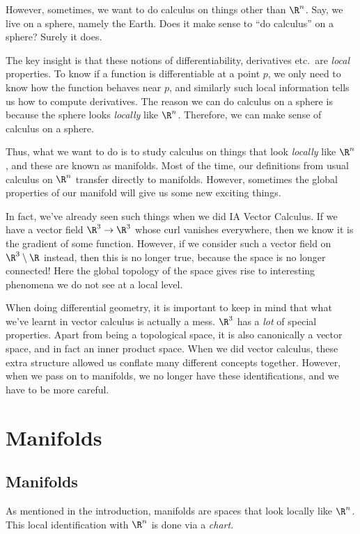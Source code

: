 \documentclass[a4paper]{article}
\begin{document}
However, sometimes, we want to do calculus on things other than $\R^n$. Say, we live on a sphere, namely the Earth. Does it make sense to ``do calculus'' on a sphere? Surely it does.

The key insight is that these notions of differentiability, derivatives etc.\ are \emph{local} properties. To know if a function is differentiable at a point $p$, we only need to know how the function behaves near $p$, and similarly such local information tells us how to compute derivatives. The reason we can do calculus on a sphere is because the sphere looks \emph{locally} like $\R^n$. Therefore, we can make sense of calculus on a sphere.

Thus, what we want to do is to study calculus on things that look \emph{locally} like $\R^n$, and these are known as manifolds. Most of the time, our definitions from usual calculus on $\R^n$ transfer directly to manifolds. However, sometimes the global properties of our manifold will give us some new exciting things.

In fact, we've already seen such things when we did IA Vector Calculus. If we have a vector field $\R^3 \to \R^3$ whose curl vanishes everywhere, then we know it is the gradient of some function. However, if we consider such a vector field on $\R^3 \setminus \R$ instead, then this is no longer true, because the space is no longer connected! Here the global topology of the space gives rise to interesting phenomena we do not see at a local level.

When doing differential geometry, it is important to keep in mind that what we've learnt in vector calculus is actually a mess. $\R^3$ has a \emph{lot} of special properties. Apart from being a topological space, it is also canonically a vector space, and in fact an inner product space. When we did vector calculus, these extra structure allowed us conflate many different concepts together. However, when we pass on to manifolds, we no longer have these identifications, and we have to be more careful.

\section{Manifolds}
\subsection{Manifolds}
As mentioned in the introduction, manifolds are spaces that look locally like $\R^n$. This local identification with $\R^n$ is done via a \emph{chart}.
\end{document}
